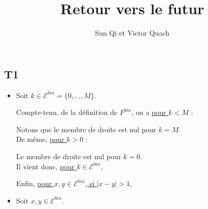 \documentclass[a4paper,11pt]{article}
\title{Retour vers le futur}
\author{Sun Qi et Victor Quach}
\date{}
\def \E{\mathcal{E}}
\begin{document}
\maketitle

\subsection*{T1}

\begin{itemize}
\item[\textbullet]
Soit $k \in \E^{bin}=\{0, \dots, M\}$. 

Compte-tenu, de la définition de $F^{bin}$, on a \underline{pour $k<M$} :


\begin{center}
\end{center}

Notons que le membre de droite est nul pour $k=M$.\\


De même, \underline{pour $k>0$} : 
\begin{center}
\end{center}
Le membre de droite est nul pour $k=0$.\\


Il vient donc, \underline{pour $k \in \E^{bin}$},
\begin{center}
\end{center}

\vspace{5mm}
Enfin, \underline{pour $x,y \in \E^{bin}$, si $|x-y|>1$},
\begin{center}
\end{center}
\vspace{5mm}



\item[\textbullet]
Soit $x,y \in \E^{bin}$.


\end{itemize}
\end{document}
